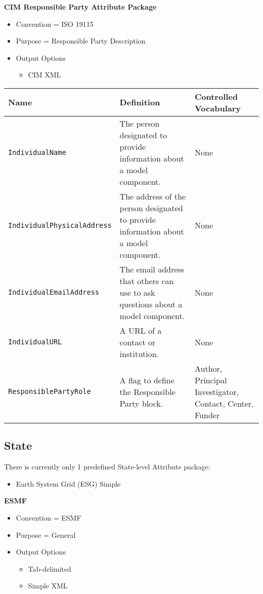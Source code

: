 {\bf CIM Responsible Party Attribute Package}

\begin{itemize}
    \item Convention = ISO 19115
    \item Purpose = Responsible Party Description
    \item Output Options
    \begin{itemize}
        \item CIM XML 
    \end{itemize} 
\end{itemize}


\begin{tabular}{|p{8cm}|p{20cm}|p{10cm}|}
     {\bf Name } & {\bf Definition} & {\bf Controlled Vocabulary} \\
     \hline\hline
     {\tt IndividualName} & The person designated to provide information about a model component. & None \\
     {\tt IndividualPhysicalAddress} & The address of the person designated to provide information about a model component. & None \\
     {\tt IndividualEmailAddress} & The email address that others can use to ask questions about a model component. & None \\
     {\tt IndividualURL} & A URL of a contact or institution. & None \\
     {\tt ResponsiblePartyRole} & A flag to define the Responsible Party block. & Author, Principal Investigator, Contact, Center, Funder\\
\end{tabular}


\subsection{State}
\label{StateAttributePackages}

There is currently only 1 predefined State-level Attribute package:

\begin{itemize}
    \item Earth System Grid (ESG) Simple
\end{itemize}

{\bf ESMF}

\begin{itemize}
    \item Convention = ESMF
    \item Purpose = General
    \item Output Options
    \begin{itemize}
        \item Tab-delimited
        \item Simple XML 
    \end{itemize} 
\end{itemize}

